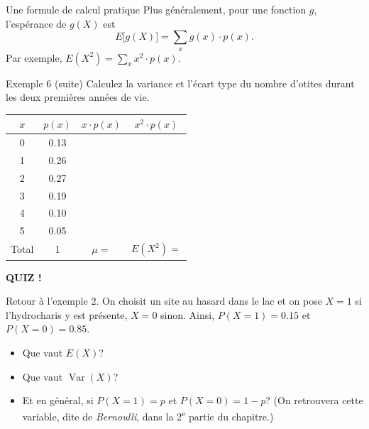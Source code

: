 \documentclass{BeamerTemplate}
\begin{document}
\begin{frame}[t]{Une formule de calcul pratique}
  Plus généralement, pour une fonction $g$, l'espérance de $g(X)$ est
  \[ E\big[g(X)\big] = \sum_x g(x) \cdot p(x). \]
  Par exemple, $E(X^2) = \sum_x x^2 \cdot p(x)$.

  \medskip
\end{frame}

\begin{frame}[t]{Exemple 6 (suite)}
  Calculez la variance et l'écart type du nombre d'otites durant les deux
  premières années de vie.

  \medskip
  \centering
  \renewcommand{\arraystretch}{1.15}
  \begin{tabular}{c|c|c|c}
    \toprule
    $x$ & $p(x)$ & $x \cdot p(x)$ & $x^2 \cdot p(x)$ \\
    \midrule
    0 & 0.13 & & \\
    1 & 0.26 & & \\
    2 & 0.27 & & \\
    3 & 0.19 & & \\
    4 & 0.10 & & \\
    5 & 0.05 & & \\
    \midrule
    Total & 1 & $\mu = $ \phantom{2.02} & $E(X^2) = $ \phantom{5.90} \\
    \bottomrule
  \end{tabular}
\end{frame}

\begin{frame}[plain,t]
  \centerline{\LARGE\bfseries\alert{QUIZ !}}

  \medskip
  Retour à l'exemple 2. On choisit un site au hasard dans le lac et on pose
  $X = 1$ si l'hydrocharis y est présente, $X = 0$ sinon.
  Ainsi, $P(X = 1) = 0.15$ et $P(X = 0) = 0.85$.
  \begin{itemize}\itemsep 1.3cm
    \item Que vaut $E(X)$?
    \item Que vaut $\operatorname{Var}(X)$?
    \item<2-> Et en général, si $P(X = 1) = p$ et $P(X = 0) = 1 - p$?
      {\small\color{gray} (On retrouvera cette variable, dite de
      \emph{Bernoulli}, dans la 2\textsuperscript{e} partie du chapitre.)}
  \end{itemize}
\end{frame}
\end{document}
